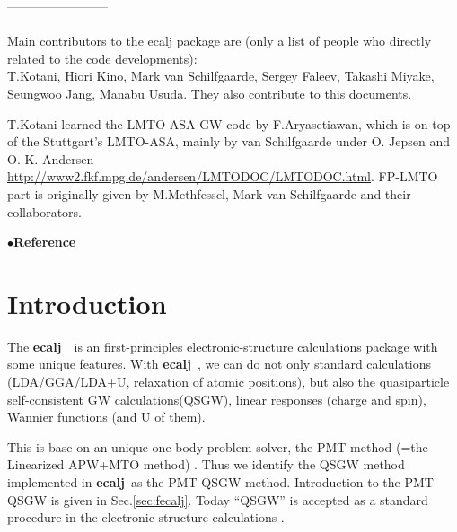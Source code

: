 \documentclass[a4paper,10pt,epsf,fleqn]{article}
\newcommand{\ecalj}{{\bf ecalj}\ }
\begin{document}
{\noindent ------------------------\\
\\
\noindent Main contributors to the ecalj package are
(only a list of people who directly related to the code developments): \\
T.Kotani, Hiori Kino, Mark van Schilfgaarde,
Sergey Faleev, Takashi Miyake, \\Seungwoo Jang, Manabu Usuda.
They also contribute to this documents.

\noindent T.Kotani learned the LMTO-ASA-GW code by {F.Aryasetiawan},
which is on top of the Stuttgart's LMTO-ASA, mainly by van Schilfgaarde
under O. Jepsen and O. K. Andersen\\
\url{http://www2.fkf.mpg.de/andersen/LMTODOC/LMTODOC.html}.
FP-LMTO part is originally given by
M.Methfessel, Mark van Schilfgaarde and their collaborators.\\
}

\tableofcontents
\vspace{5mm}
\noindent$\bullet${\bf Reference}


\newpage



\newpage
\section{Introduction}
The \ecalj\ is an first-principles electronic-structure 
calculations package with some unique features.
With \ecalj, we can do not only standard calculations
(LDA/GGA/LDA+U, relaxation of atomic positions), but also 
the quasiparticle self-consistent GW calculations(QSGW),
linear responses (charge and spin), Wannier functions (and U of them).

This is base on an unique one-body problem solver, the PMT method 
(=the Linearized APW+MTO method) \cite{kotani2015pmt}.
Thus we identify the QSGW method implemented in \ecalj as the PMT-QSGW method.
Introduction to the PMT-QSGW is given in Sec.\ref{sec:fecalj}. 
Today ``QSGW'' is accepted as a standard procedure in the electronic
structure calculations \cite{di_valentin_quasiparticle_2014}.
\end{document}
